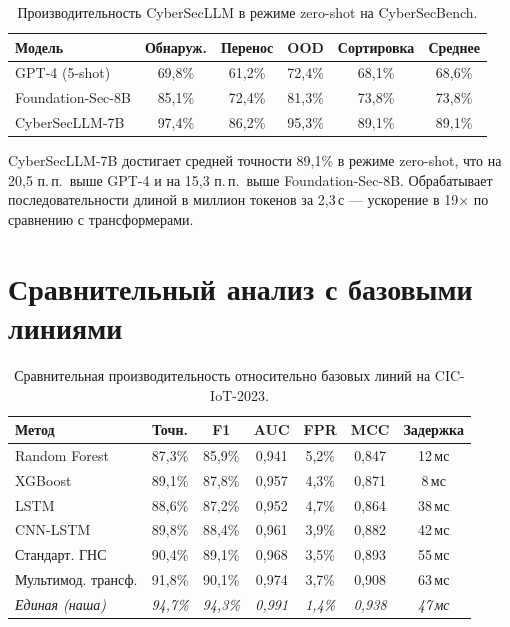 \begin{table}[htbp]
\centering
\caption{Производительность CyberSecLLM в режиме zero-shot на CyberSecBench.}
\label{tab:cybersecllm_results}
\begin{tabular}{lccccc}
\toprule
Модель & Обнаруж. & Перенос & OOD & Сортировка & Среднее \\
\midrule
GPT-4 (5-shot)    & 69,8\% & 61,2\% & 72,4\% & 68,1\% & 68,6\% \\
Foundation-Sec-8B & 85,1\% & 72,4\% & 81,3\% & 73,8\% & 73,8\% \\
CyberSecLLM-7B    & 97,4\% & 86,2\% & 95,3\% & 89,1\% & 89,1\% \\
\bottomrule
\end{tabular}
\end{table}

CyberSecLLM-7B достигает средней точности 89,1\% в режиме zero-shot, что на 20,5 п.\,п.\ выше GPT-4 и на 15,3 п.\,п.\ выше Foundation-Sec-8B. Обрабатывает последовательности длиной в миллион токенов за 2,3\,с --- ускорение в 19$\times$ по сравнению с трансформерами.


\section{Сравнительный анализ с базовыми линиями}
\label{sec:comparative}

\begin{table}[htbp]
\centering
\caption{Сравнительная производительность относительно базовых линий на CIC-IoT-2023.}
\label{tab:comparative}
\begin{tabular}{lcccccc}
\toprule
Метод & Точн. & F1 & AUC & FPR & MCC & Задержка \\
\midrule
Random Forest      & 87,3\% & 85,9\% & 0,941 & 5,2\% & 0,847 & 12\,мс \\
XGBoost            & 89,1\% & 87,8\% & 0,957 & 4,3\% & 0,871 & 8\,мс \\
LSTM               & 88,6\% & 87,2\% & 0,952 & 4,7\% & 0,864 & 38\,мс \\
CNN-LSTM           & 89,8\% & 88,4\% & 0,961 & 3,9\% & 0,882 & 42\,мс \\
Стандарт. ГНС      & 90,4\% & 89,1\% & 0,968 & 3,5\% & 0,893 & 55\,мс \\
Мультимод. трансф.  & 91,8\% & 90,1\% & 0,974 & 3,7\% & 0,908 & 63\,мс \\
\textit{Единая (наша)}   & \textit{94,7\%} & \textit{94,3\%} & \textit{0,991} & \textit{1,4\%} & \textit{0,938} & \textit{47\,мс} \\
\bottomrule
\end{tabular}
\end{table}

